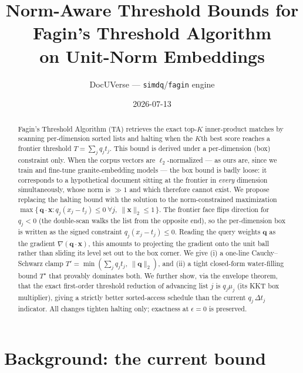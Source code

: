 \documentclass[11pt,a4paper]{article}
\title{\textbf{Norm-Aware Threshold Bounds for Fagin's Threshold Algorithm\\
on Unit-Norm Embeddings}}
\author{DocUVerse --- \texttt{simdq}/\texttt{fagin} engine}
\date{2026-07-13}
\newcommand{\qv}{\mathbf{q}}
\newcommand{\xv}{\mathbf{x}}
\newcommand{\norm}[1]{\lVert #1 \rVert}
\begin{document}
\maketitle

\begin{abstract}
Fagin's Threshold Algorithm (TA) retrieves the exact top-$K$ inner-product
matches by scanning per-dimension sorted lists and halting when the $K$th best
score reaches a frontier threshold $T=\sum_j q_j t_j$. This bound is derived
under a per-dimension (box) constraint only. When the corpus vectors are
$\ell_2$-normalized --- as ours are, since we train and fine-tune
granite-embedding models --- the box bound is badly loose: it corresponds to a
hypothetical document sitting at the frontier in \emph{every} dimension
simultaneously, whose norm is $\gg 1$ and which therefore cannot exist. We
propose replacing the halting bound with the solution to the norm-constrained
maximization $\max\{\,\qv\cdot\xv : q_j(x_j-t_j)\le0\ \forall j,\
\norm{\xv}_2\le 1\,\}$. The frontier face flips direction for $q_j<0$ (the
double-scan walks the list from the opposite end), so the per-dimension box is
written as the signed constraint $q_j(x_j-t_j)\le0$. Reading
the query weights $\qv$ as the gradient $\nabla(\qv\cdot\xv)$, this amounts to
projecting the gradient onto the unit ball rather than sliding its level set out
to the box corner. We give (i) a one-line Cauchy--Schwarz clamp
$T'=\min(\sum_j q_j t_j,\ \norm{\qv}_2)$, and (ii) a tight closed-form
water-filling bound $T^\star$ that provably dominates both. We further show, via
the envelope theorem, that the exact first-order threshold reduction of
advancing list $j$ is $q_j\mu_j$ (its KKT box multiplier), giving a strictly
better sorted-access schedule than the current $q_j\,\Delta t_j$ indicator. All
changes tighten halting only; exactness at $\epsilon=0$ is preserved.
\end{abstract}

\section{Background: the current bound}
\end{document}
